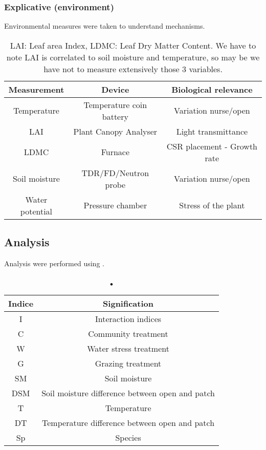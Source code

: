 \documentclass[12pt]{article} %
\begin{document}
\subsubsection{Explicative (environment)}
Environmental measures were taken to understand mechanisms.
\begin{table}[h]
\begin{center}
\begin{tabular}{ccc}
Measurement & Device & Biological relevance\\
\hline
Temperature & Temperature coin battery & Variation nurse/open\\
LAI & Plant Canopy Analyser & Light transmittance\\
LDMC & Furnace & CSR placement - Growth rate\\
Soil moisture & TDR/FD/Neutron probe & Variation nurse/open\\
Water potential & Pressure chamber & Stress of the plant\\
\hline 
\end{tabular}
\caption{LAI: Leaf area Index, LDMC: Leaf Dry Matter Content. We have to note LAI is correlated to soil moisture and temperature, so may be we have not to measure extensively those 3 variables.}
\end{center}
\end{table}


\subsection{Analysis}

Analysis were performed using \citep{RCoreTeam2015}.
\begin{table}[h]
\begin{center}
\begin{tabular}{cc}
Indice & Signification\\
\hline
I & Interaction indices\\
C & Community treatment\\
W & Water stress treatment\\
G & Grazing treatment\\
SM & Soil moisture\\
DSM & Soil moisture difference between open and patch\\
T & Temperature \\
DT & Temperature difference between open and patch \\
Sp & Species \\
\hline 
\end{tabular}
\caption{•}
\end{center}
\end{table}
\end{document}
